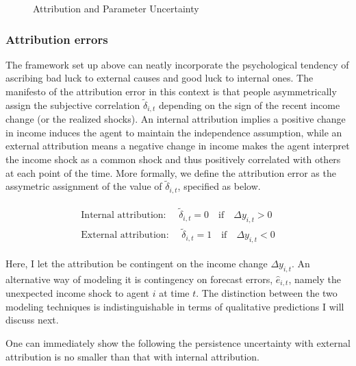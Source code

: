 \documentclass[12pt,notitlepage,onecolumn,aps,pra]{article}
\begin{document}
    \begin{figure*}[!ht]
        \begin{center}\end{center}
        \caption{Attribution and Parameter Uncertainty}
        \label{fig:corr_var}
    \end{figure*}
    
    \hypertarget{attribution-errors}{%
\subsubsection{Attribution errors}\label{attribution-errors}}

The framework set up above can neatly incorporate the psychological
tendency of ascribing bad luck to external causes and good luck to
internal ones. The manifesto of the attribution error in this context is
that people asymmetrically assign the subjective correlation
\(\tilde \delta_{i,t}\) depending on the sign of the recent income
change (or the realized shocks). An internal attribution implies a
positive change in income induces the agent to maintain the independence
assumption, while an external attribution means a negative change in
income makes the agent interpret the income shock as a common shock and
thus positively correlated with others at each point of the time. More
formally, we define the attribution error as the assymetric assignment
of the value of \(\tilde\delta_{i,t}\), specified as below.

\begin{eqnarray}
\begin{split}
\textrm{Internal attribution: }\quad \tilde\delta_{i,t} = 0 \quad \textrm{if} \quad \Delta y_{i,t}>0 \\
\textrm{External attribution: }\quad \tilde\delta_{i,t} = 1 \quad \textrm{if} \quad \Delta y_{i,t}<0
\end{split}
\end{eqnarray}

Here, I let the attribution be contingent on the income change
\(\Delta y_{i,t}\). An alternative way of modeling it is contingency on
forecast errors, \(\widehat e_{i,t}\), namely the unexpected income
shock to agent \(i\) at time \(t\). The distinction between the two
modeling techniques is indistinguishable in terms of qualitative
predictions I will discuss next.

One can immediately show the following the persistence uncertainty with
external attribution is no smaller than that with internal attribution.
\end{document}
